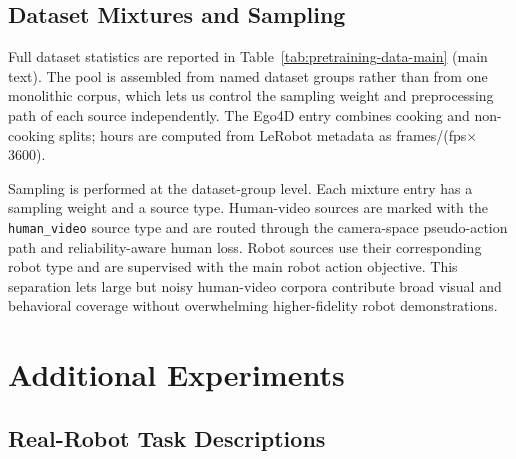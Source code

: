 \documentclass{llmxive}
\begin{document}
\subsection{Dataset Mixtures and Sampling}
\label{app:dataset-mixtures}

Full dataset statistics are reported in Table~\ref{tab:pretraining-data-main} (main text). The pool is assembled from named dataset groups rather than from one monolithic corpus, which lets us
control the sampling weight and preprocessing path of each source independently. The Ego4D entry combines cooking and non-cooking splits; hours are computed from LeRobot metadata as
frames/(fps$\times$3600).

Sampling is performed at the dataset-group level. Each mixture entry has a sampling weight and a source type. Human-video sources are marked with the \texttt{human\_video} source type and are routed
through the camera-space pseudo-action path and reliability-aware human loss. Robot sources use their corresponding robot type and are supervised with the main robot action objective. This separation lets
large but noisy human-video corpora contribute broad visual and behavioral coverage without overwhelming higher-fidelity robot demonstrations.

\section{Additional Experiments}
\label{app:additional-experiments}



\subsection{Real-Robot Task Descriptions}
\label{app:real-robot-task-descriptions}
\end{document}
